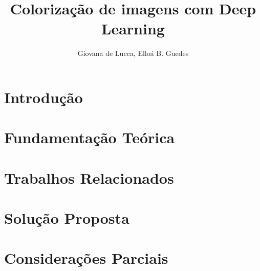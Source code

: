\documentclass[12pt]{article}
\title{Colorização de imagens com Deep Learning}
\author{Giovana de Lucca, Elloá B. Guedes}
\begin{document}
\maketitle

\section{Introdução}


\section{Fundamentação Teórica} \label{sec:fundamentacao}


\section{Trabalhos Relacionados} \label{sec:relacionados}


\section{Solução Proposta} \label{sec:solucao}




\section{Considerações Parciais} \label{sec:consideracoes}



\end{document}
